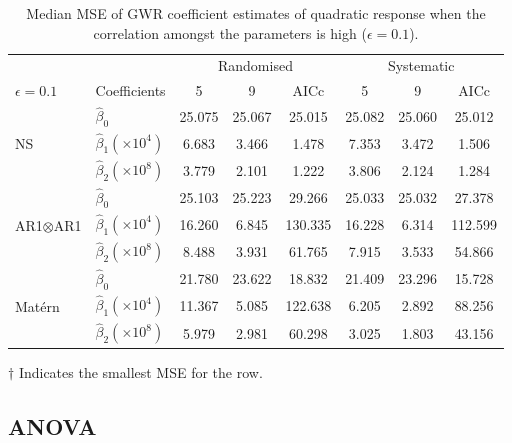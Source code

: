 \documentclass[a4paper]{article} 	%
\newcommand{\Matern}{Mat\'ern }
\begin{document}
\begin{table}[!htp]
	\centering
\begin{threeparttable}
	\caption{Median MSE of GWR coefficient estimates of quadratic response when the correlation amongst the parameters is high ($\epsilon=0.1$).}\label{tb:MSEquadraticHigh}
	\begin{tabular}{llcccccc} \toprule
		&  & \multicolumn{3}{c}{Randomised} & \multicolumn{3}{c}{Systematic} \\ 
		$\epsilon=0.1$  & Coefficients & 5  & 9  & AICc & 5  & 9  & AICc \\ \midrule
		\multirow{3}{*}{NS} & $\hat{\beta}_0$  & 25.075 & 25.067 & 25.015  & 25.082 & 25.060 & 25.012\tnote{$\dagger$} \\
		&$\hat{\beta}_1 (\times 10^4)$  & 6.683  & 3.466  & 1.478\tnote{$\dagger$} & 7.353  & 3.472  & 1.506 \\
		&$\hat{\beta}_2 (\times 10^8)$  & 3.779  & 2.101  & 1.222\tnote{$\dagger$} & 3.806  & 2.124  & 1.284 \\  \midrule
		\multirow{3}{*}{AR1$\otimes$AR1} & $\hat{\beta}_0$  & 25.103 & 25.223 & 29.266  & 25.033 & 25.032\tnote{$\dagger$} & 27.378 \\
		& $\hat{\beta}_1 (\times 10^4)$ & 16.260 & 6.845  & 130.335 & 16.228 & 6.314\tnote{$\dagger$}  & 112.599  \\
		& $\hat{\beta}_2 (\times 10^8)$  & 8.488  & 3.931  & 61.765  & 7.915  & 3.533\tnote{$\dagger$}  & 54.866  \\  \midrule
		\multirow{3}{*}{\Matern} & $\hat{\beta}_0$ & 21.780 & 23.622 & 18.832  & 21.409 & 23.296 & 15.728\tnote{$\dagger$}  \\
		& $\hat{\beta}_1 (\times 10^4)$ & 11.367 & 5.085  & 122.638 & 6.205  & 2.892\tnote{$\dagger$}  & 88.256 \\
		& $\hat{\beta}_2 (\times 10^8)$  & 5.979  & 2.981  & 60.298  & 3.025  & 1.803\tnote{$\dagger$}  & 43.156  \\ \bottomrule
	\end{tabular}
		    \begin{tablenotes}
	        \item[$\dagger$] \footnotesize Indicates the smallest MSE for the row.
	    \end{tablenotes}
\end{threeparttable}
\end{table}


\subsection{ANOVA}\label{Sec:anova}
\end{document}
